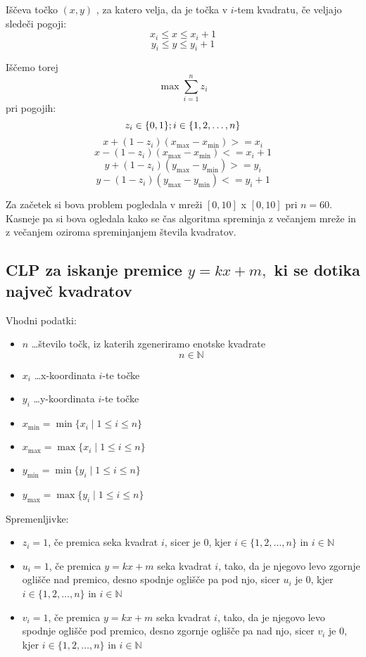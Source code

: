 \documentclass[a4paper]{article}
\begin{document}
Iščeva točko $(x,y)$ , za katero velja, da je točka v $i$-tem kvadratu, če veljajo sledeči pogoji:
$$x_i \le x \le x_i+1$$
$$y_i \le y \le y_i+1$$

Iščemo torej \\
$$\max\sum_{i=1}^n z_{i} $$
pri pogojih:
$$z_{i} \in \{0,1\};i \in \{1, 2, \dots, n\}\\$$
$$ x + (1-z_i)(x_{\max} - x_{\min}) >= x_i $$
$$ x - (1-z_i)(x_{\max} - x_{\min}) <= x_i + 1 $$
$$ y + (1-z_i)(y_{\max} - y_{\min}) >= y_i $$
$$ y - (1-z_i)(y_{\max} - y_{\min}) <= y_i + 1 $$

Za začetek si bova problem pogledala v mreži $[0,10]$ x $[0,10]$ pri $n = 60$. Kasneje pa si bova ogledala kako se čas algoritma spreminja z večanjem mreže in z večanjem oziroma spreminjanjem števila kvadratov.\\

\subsection{CLP za iskanje premice $y = kx + m,$ ki se dotika največ kvadratov}

Vhodni podatki:

\begin{itemize}
\item{$n$ \dots število točk, iz katerih zgeneriramo enotske kvadrate} $$n \in \mathbb{N}$$
\item{$x_{i}$ \dots x-koordinata $i$-te točke}
\item{$y_{i}$ \dots y-koordinata $i$-te točke}
\item{$x_{\min} = \min \{x_i \mid 1 \le i \le n\}$}
\item{$x_{\max} = \max \{x_i \mid 1 \le i \le n\}$}
\item{$y_{\min} = \min \{y_i \mid 1 \le i \le n\}$}
\item{$y_{\max} = \max \{y_i \mid 1 \le i \le n\}$}
\end{itemize}

Spremenljivke:

\begin{itemize}
\item{$z_{i}= 1$, če premica seka kvadrat $i$}, sicer je $0$, kjer $i \in \{1, 2, \dots, n\}$ in $i \in \mathbb{N}$
\item{$u_{i}= 1$, če premica $y = kx + m$ seka kvadrat $i$}, tako, da je njegovo levo zgornje oglišče nad premico, desno spodnje oglišče pa pod njo, sicer $u_i$ je $0$, kjer $i \in \{1, 2, \dots, n\}$ in $i \in \mathbb{N}$
\item{$v_{i}= 1$, če premica $y = kx + m$ seka kvadrat $i$},  tako, da je njegovo levo spodnje oglišče pod premico, desno zgornje oglišče pa nad njo, sicer $v_i$ je $0$, kjer $i \in \{1, 2, \dots, n\}$ in $i \in \mathbb{N}$
\end{itemize}
\end{document}
